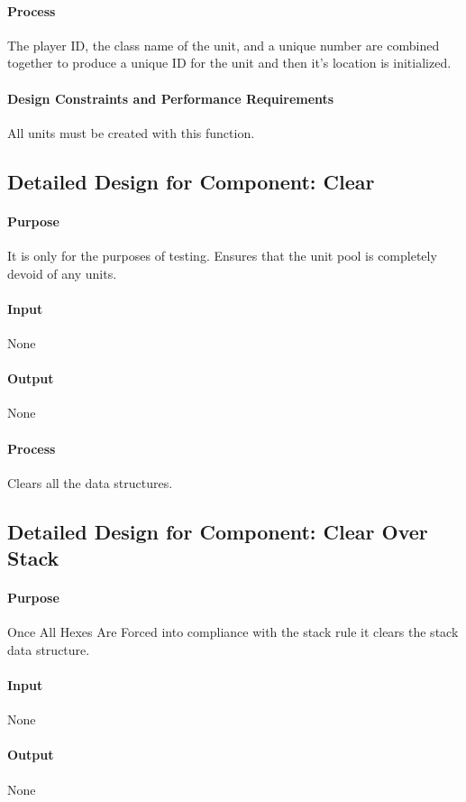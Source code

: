 \documentclass[12pt,a4paper,titlepage]{article}
\begin{document}
\paragraph{Process} The player ID, the class name of the unit, and a unique number are combined together to produce a unique ID for the unit and then it's location is initialized.
\paragraph{Design Constraints and Performance Requirements} All units must be created with this function.

\subsection{Detailed Design for Component: Clear}
\paragraph{Purpose} It is only for the purposes of testing. Ensures that the unit pool is completely devoid of any units.
\paragraph{Input} None
\paragraph{Output} None
\paragraph{Process} Clears all the data structures.

\subsection{Detailed Design for Component: Clear Over Stack}
\paragraph{Purpose} Once All Hexes Are Forced into compliance with the stack rule it clears the stack data structure.
\paragraph{Input} None
\paragraph{Output} None
\end{document}
